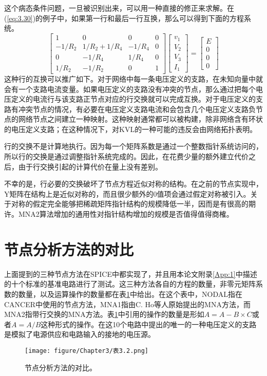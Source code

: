 这个病态条件问题，一旦被识别出来，可以用一种直接的修正来求解。在(\ref{eq:3.30})的例子中，如果第一行和最后一行互换，那么可以得到下面的方程系统。
\begin{equation}
    \begin{bmatrix}
    1 & 0 & 0 & 0 \\
    -1/R_2 & 1/R_2 + 1/R_4  & -1/R_4 & 0 \\
    0 & -1/R_4 & 1/R_4 & 0 \\
    1/R_2 & -1/R_2 & 0 & 1
    \end{bmatrix}\begin{bmatrix}
    v_1 \\
    V_2 \\
    V_3 \\
    I_1
    \end{bmatrix} = \begin{bmatrix}
    E \\
    0 \\
    0 \\
    0
    \end{bmatrix}
    \label{eq:3.31}
\end{equation}
这种行的互换可以推广如下。对于网络中每一条电压定义的支路，在未知向量中就会有一个支路电流变量。如果电压定义的支路没有冲突的节点，那么通过把每个电压定义的电流行与该支路正节点对应的行交换就可以完成互换。对于电压定义的支路有冲突节点的情况，有必要在电压定义支路电流和会包含几个电压定义支路负节点的网络节点之间建立一种映射。这种映射通常都可以被构建，除非网络含有环状的电压定义支路；在这种情况下，对KVL的一种可能的违反会由网络拓扑表明。

行的交换不是计算地执行。因为每一个矩阵系数是通过一个整数指针系统访问的，所以行的交换是通过调整指针系统完成的。因此，在花费少量的额外建立代价之后，由于行交换引起的计算代价在量上没有差别。

不幸的是，行必要的交换破坏了节点方程近似对称的结构。在之前的节点实现中，Y矩阵在结构上是近似对称的，而且很少额外的0值项会通过假定对称被引入。关于对称的假定完全能够把稀疏矩阵指针结构的规模降低一半，因而是有很高的期许。MNA2算法增加的通用性对指针结构增加的规模是否值得值得商榷。

\section{节点分析方法的对比}
上面提到的三种节点方法在SPICE中都实现了，并且用本论文附录\ref{App:1}中描述的十个标准的基准电路进行了测试。这三种方法各自的方程的数量，非零元矩阵系数的数量，以及运算操作的数量都在表\ref{表3.2}中给出。在这个表中，NODAL指在CANCER中使用的节点方法，MNA1指由C. Ho等人\cite{ref-47}原始提出的MNA方法，而MNA2指带行交换的MNA方法。表\ref{表3.2}中引用的操作的数量是形如$A=A-B \times C$或者$A=A/B$这种形式的操作。在这10个电路中提出的唯一的一种电压定义的支路是模拟了电源供应和电路输入的接地的电压源。
\begin{figure}[htbp]
\small
    \centering
    \texttt{[image: figure/Chapter3/表3.2.png]}
    \caption{节点分析方法的对比。}
    \label{表3.2}
\end{figure}

